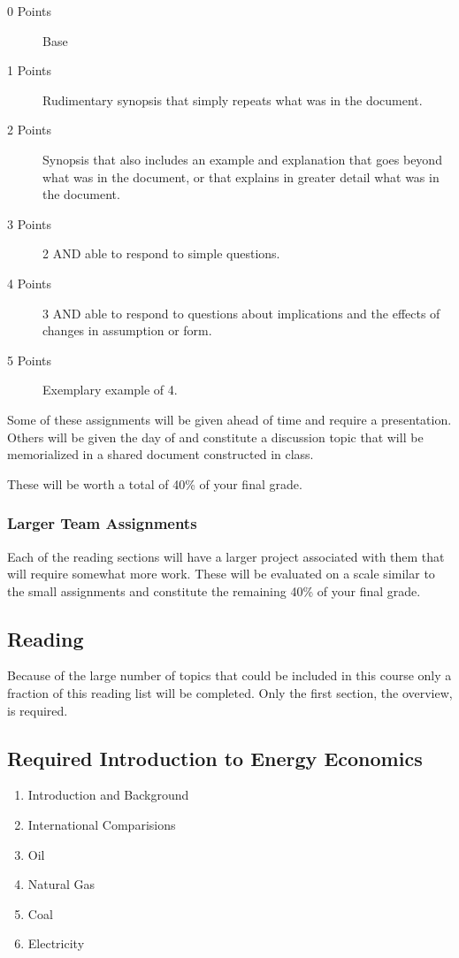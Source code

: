 \documentclass[letterpaper,10pt]{article}
\begin{document}
\begin{description}
\item[0 Points] Base
 \item[1 Points] Rudimentary synopsis that simply repeats what was in the document.
 \item[2 Points] Synopsis that also includes an example and explanation that goes beyond what was in the document, or that explains in greater detail what was in the document.
 \item[3 Points] 2 AND able to respond to simple questions.
 \item[4 Points] 3 AND able to respond to questions about implications and the effects of changes in assumption or form.
 \item[5 Points] Exemplary example of 4. 
 \end{description}

Some of these assignments will be given ahead of time and require a presentation.  Others will be given the day of and constitute a discussion topic that will be memorialized in a shared document constructed in class.

These will be worth a total of 40\% of your final grade.

\subsubsection{Larger Team Assignments}

Each of the reading sections will have a larger project associated with them that will require somewhat more work.  These will be evaluated on a scale similar to the small assignments and constitute the remaining 40\% of your final grade.


\subsection{Reading}

Because of the large number of topics that could be included in this course only a fraction of this reading list will be completed.  Only the first section, the overview, is required.

\subsection{Required Introduction to Energy Economics}
  \begin{enumerate}
    \item Introduction and Background
    \item International Comparisions
    \item Oil
    \item Natural Gas
    \item Coal
    \item Electricity
 \end{enumerate}
  
\end{document}
